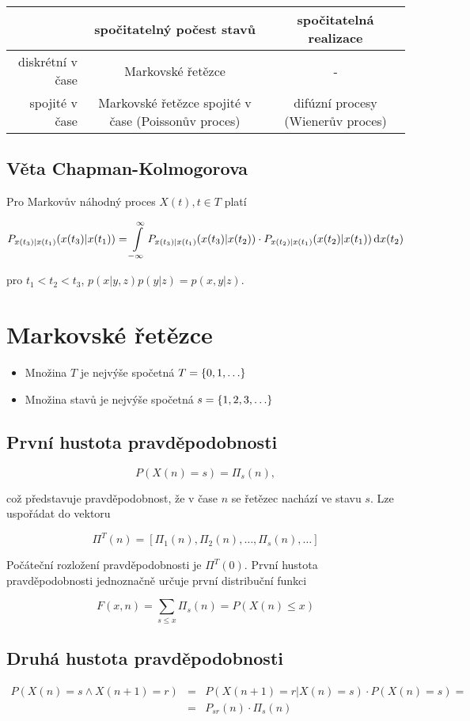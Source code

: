 \begin{table}[H]
\centering
\begin{tabular}{r|cc}
& spočitatelný počest stavů & spočitatelná realizace\\\hline
diskrétní v čase & Markovské řetězce & -\\
spojité v čase & Markovské řetězce spojité v čase (Poissonův proces) & difúzní procesy (Wienerův proces)
\end{tabular}
\end{table}

\subsection{Věta Chapman-Kolmogorova}
Pro Markovův náhodný proces $X(t),t\in T$ platí

\[ P_{x(t_3)|x(t_1)}(x(t_3)|x(t_1))=\int\limits_{-\infty}^\infty P_{x(t_3)|x(t_1)}(x(t_3)|x(t_2))\cdot P_{x(t_2)|x(t_1)}(x(t_2)|x(t_1))\,\mathrm{d} x(t_2) \]

pro $t_1<t_2<t_3$, $p(x|y, z)p(y|z)=p(x,y|z)$.

\section{Markovské řetězce}
\begin{itemize}[noitemsep]
\item Množina $T$ je nejvýše spočetná $T=\left\{0,1,\ldots\right\}$
\item Množina stavů je nejvýše spočetná $s=\left\{1,2,3,\ldots\right\}$
\end{itemize}

\subsection{První hustota pravděpodobnosti}

\[ P(X(n)=s)=\Pi_s(n), \]

což představuje pravděpodobnost, že v čase $n$ se řetězec nachází ve stavu $s$. Lze uspořádat do vektoru

\[ \Pi^T(n) = [\Pi_1(n),\Pi_2(n),\ldots,\Pi_s(n),\ldots] \]

Počáteční rozložení pravděpodobnosti je $\Pi^T(0)$. První hustota pravděpodobnosti jednoznačně určuje první distribuční funkci

\[ F(x,n)=\sum_{s\leq x} \Pi_s(n)=P(X(n)\leq x) \]

\subsection{Druhá hustota pravděpodobnosti}
\begin{eqnarray*}
P(X(n)=s\wedge X(n+1)=r) & = & P(X(n+1)=r|X(n)=s)\cdot P(X(n)=s) =\\
& = & P_{sr}(n)\cdot\Pi_s(n)
\end{eqnarray*}

